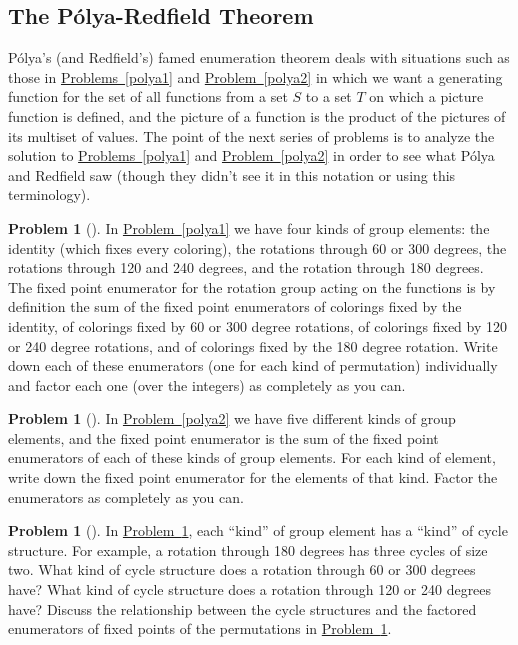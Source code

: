 \documentclass[10pt,]{book}
\theoremstyle{plain}
\theoremstyle{definition}
\newtheorem{activity}[project]{Problem}
\theoremstyle{definition}
\numberwithin{equation}{chapter}
\begin{document}
\subsection[{The Pólya-Redfield Theorem}]{The Pólya-Redfield Theorem}\label{subsection-69}
Pólya's (and Redfield's) famed enumeration theorem deals with situations such as those in \hyperref[polya1]{Problems~\ref{polya1}} and \hyperref[polya2]{Problem~\ref{polya2}} in which we want a generating function for the set of all functions from a set \(S\) to a set \(T\) on which a picture function is defined, and the picture of a function is the product of the pictures of its multiset of values. The point of the next series of problems is to analyze the solution to \hyperref[polya1]{Problems~\ref{polya1}} and \hyperref[polya2]{Problem~\ref{polya2}} in order to see what Pólya and Redfield saw (though they didn't see it in this notation or using this terminology).%
\begin{activity}[] \label{polya3}
In \hyperref[polya1]{Problem~\ref{polya1}} we have four kinds of group elements: the identity (which fixes every coloring), the rotations through 60 or 300 degrees, the rotations through 120 and 240 degrees, and the rotation through 180 degrees. The fixed point enumerator for the rotation group acting on the functions is by definition the sum of the fixed point enumerators of colorings fixed by the identity, of colorings fixed by 60 or 300 degree rotations, of colorings fixed by 120 or 240 degree rotations, and of colorings fixed by the 180 degree rotation. Write down each of these enumerators (one for each kind of permutation) individually and factor each one (over the integers) as completely as you can.%
\end{activity}
\begin{activity}[] \label{polya4}
In \hyperref[polya2]{Problem~\ref{polya2}} we have five different kinds of group elements, and the fixed point enumerator is the sum of the fixed point enumerators of each of these kinds of group elements. For each kind of element, write down the fixed point enumerator for the elements of that kind. Factor the enumerators as completely as you can.%
\end{activity}
\begin{activity}[] \label{polya3_5}
In \hyperref[polya3]{Problem~\ref{polya3}}, each ``kind'' of group element has a ``kind'' of cycle structure. For example, a rotation through 180 degrees has three cycles of size two. What kind of cycle structure does a rotation through 60 or 300 degrees have? What kind of cycle structure does a rotation through 120 or 240 degrees have? Discuss the relationship between the cycle structures and the factored enumerators of fixed points of the permutations in \hyperref[polya3]{Problem~\ref{polya3}}.%
\end{activity}
\end{document}

